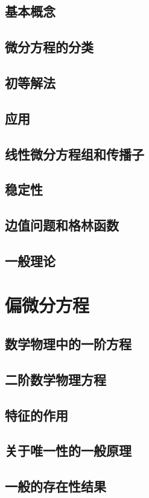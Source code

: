 \section{基本概念}
\section{微分方程的分类}
\section{初等解法}
\section{应用}
\section{线性微分方程组和传播子}
\section{稳定性}
\section{边值问题和格林函数}
\section{一般理论}

\chapter{偏微分方程}
\section{数学物理中的一阶方程}
\section{二阶数学物理方程}
\section{特征的作用}
\section{关于唯一性的一般原理}
\section{一般的存在性结果}

